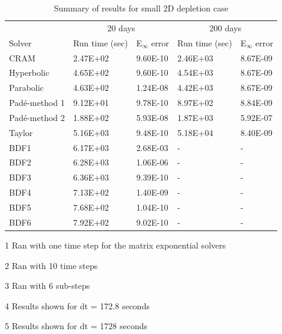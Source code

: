 \begin{table}[p]
\centering
\begin{threeparttable}
   \caption{\label{tab:small_2D_depletion_runtimes} Summary of results for small 2D depletion case}
   \begin{tabular}{lllll}
   \hline
   \multicolumn{1}{c}{} & \multicolumn{2}{c}{20 days\tnote{1}} & \multicolumn{2}{c}{200 days\tnote{2}} \\
   \cline{2-5} 
   Solver & Run time (sec) & E$_{\infty}$ error & Run time (sec) & E$_{\infty}$ error \\
   \hline
   CRAM\tnote{3} & 2.47E+02 & 9.60E-10 & 2.46E+03 & 8.67E-09 \\
   Hyperbolic\tnote{3} & 4.65E+02 & 9.60E-10 & 4.54E+03 & 8.67E-09 \\
   Parabolic\tnote{3} & 4.63E+02 & 1.24E-08 & 4.42E+03 & 8.67E-09 \\
   Pad\'e-method 1 & 9.12E+01 & 9.78E-10 & 8.97E+02 & 8.84E-09 \\
   Pad\'e-method 2 & 1.88E+02 & 5.93E-08 & 1.87E+03 & 5.92E-07 \\
   Taylor & 5.16E+03 & 9.48E-10 & 5.18E+04 & 8.40E-09 \\
   BDF1\tnote{4} & 6.17E+03 & 2.68E-03 & - & - \\
   BDF2\tnote{4} & 6.28E+03 & 1.06E-06 & - & - \\
   BDF3\tnote{4} & 6.36E+03 & 9.39E-10 & - & - \\
   BDF4\tnote{5} & 7.13E+02 & 1.40E-09 & - & - \\
   BDF5\tnote{5} & 7.68E+02 & 1.04E-10 & - & - \\
   BDF6\tnote{5} & 7.92E+02 & 9.02E-10 & - & - \\
   \hline
   \end{tabular}
	\begin{tablenotes}
      \small
      \item [1] Ran with one time step for the matrix exponential solvers
      \item [2] Ran with 10 time steps
      \item [3] Ran with 6 sub-steps
      \item [4] Results shown for dt = 172.8 seconds
      \item [5] Results shown for dt = 1728 seconds
    \end{tablenotes}
\end{threeparttable}
\end{table} 

\clearpage

